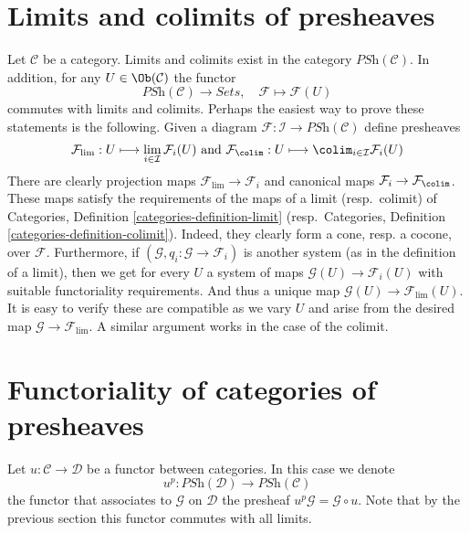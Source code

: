 \section{Limits and colimits of presheaves}
\label{section-limits-colimits-PSh}

\noindent
Let $\mathcal{C}$ be a category.
Limits and colimits exist in the category
$\textit{PSh}(\mathcal{C})$. In addition, for any
$U \in \Ob(\mathcal{C})$ the functor
$$
\textit{PSh}(\mathcal{C})
\longrightarrow
\textit{Sets}, \quad
\mathcal{F}
\longmapsto
\mathcal{F}(U)
$$
commutes with limits and colimits. Perhaps the easiest way to prove
these statements is the following. Given a diagram
$
\mathcal{F} :
\mathcal{I}
\to
\textit{PSh}(\mathcal{C})
$
define presheaves
$$
\mathcal{F}_{\lim} :
U
\longmapsto
\lim_{i \in \mathcal{I}} \mathcal{F}_i(U)
\text{  and  }
\mathcal{F}_{\colim} :
U
\longmapsto
\colim_{i \in \mathcal{I}} \mathcal{F}_i(U)
$$
There are clearly projection maps $\mathcal{F}_{\lim} \to \mathcal{F}_i$
and canonical maps $\mathcal{F}_i \to \mathcal{F}_{\colim}$. These
maps satisfy the requirements of the maps of a limit (resp.\ colimit)
of Categories, Definition \ref{categories-definition-limit}
(resp.\ Categories, Definition \ref{categories-definition-colimit}).
Indeed, they clearly form a cone, resp. a cocone, over $\mathcal{F}$.
Furthermore, if $(\mathcal{G}, q_i : \mathcal{G} \to \mathcal{F}_i)$
is another
system (as in the definition of a limit), then we get for every
$U$ a system of maps $\mathcal{G}(U) \to \mathcal{F}_i(U)$
with suitable functoriality requirements. And thus a unique
map $\mathcal{G}(U) \to \mathcal{F}_{\lim}(U)$. It is easy
to verify these are compatible  as we vary $U$ and arise from
the desired map $\mathcal{G} \to \mathcal{F}_{\lim}$.
A similar argument works in the case of the colimit.





















\section{Functoriality of categories of presheaves}
\label{section-functoriality-PSh}

\noindent
Let $u : \mathcal{C} \to \mathcal{D}$ be a functor between categories.
In this case we denote
$$
u^p :
\textit{PSh}(\mathcal{D})
\longrightarrow
\textit{PSh}(\mathcal{C})
$$
the functor that associates to $\mathcal{G}$ on $\mathcal{D}$ the presheaf
$u^p\mathcal{G} = \mathcal{G} \circ u$. Note that by the previous section
this functor commutes with all limits.

